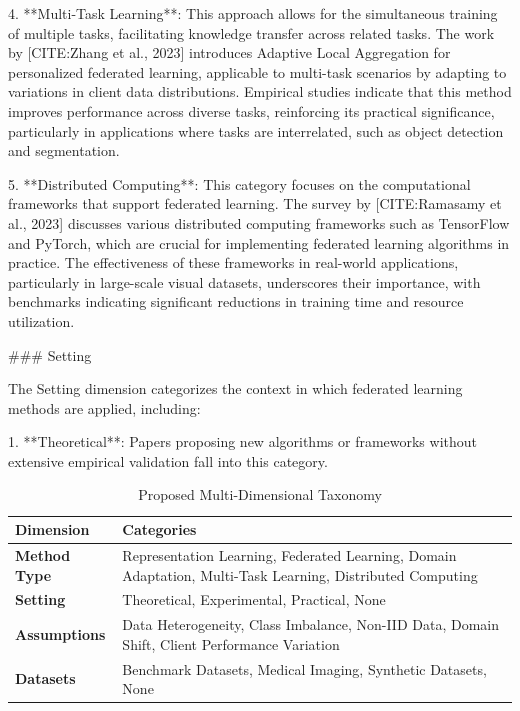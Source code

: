 \documentclass[journal]{IEEEtran}
\begin{document}
4. **Multi-Task Learning**: This approach allows for the simultaneous training of multiple tasks, facilitating knowledge transfer across related tasks. The work by [CITE:Zhang et al., 2023] introduces Adaptive Local Aggregation for personalized federated learning, applicable to multi-task scenarios by adapting to variations in client data distributions. Empirical studies indicate that this method improves performance across diverse tasks, reinforcing its practical significance, particularly in applications where tasks are interrelated, such as object detection and segmentation.

5. **Distributed Computing**: This category focuses on the computational frameworks that support federated learning. The survey by [CITE:Ramasamy et al., 2023] discusses various distributed computing frameworks such as TensorFlow and PyTorch, which are crucial for implementing federated learning algorithms in practice. The effectiveness of these frameworks in real-world applications, particularly in large-scale visual datasets, underscores their importance, with benchmarks indicating significant reductions in training time and resource utilization.

\#\#\# Setting

The Setting dimension categorizes the context in which federated learning methods are applied, including:

1. **Theoretical**: Papers proposing new algorithms or frameworks without extensive empirical validation fall into this category.

\begin{table}[!t]
\renewcommand{\arraystretch}{1.3}
\caption{Proposed Multi-Dimensional Taxonomy}
\label{tab:taxonomy}
\centering
\begin{tabular}{p{3cm}p{9cm}}
\toprule
\textbf{Dimension} & \textbf{Categories} \\
\midrule
\textbf{Method Type} & Representation Learning, Federated Learning, Domain Adaptation, Multi-Task Learning, Distributed Computing \\
\textbf{Setting} & Theoretical, Experimental, Practical, None \\
\textbf{Assumptions} & Data Heterogeneity, Class Imbalance, Non-IID Data, Domain Shift, Client Performance Variation \\
\textbf{Datasets} & Benchmark Datasets, Medical Imaging, Synthetic Datasets, None \\
\bottomrule
\end{tabular}
\end{table}
\end{document}
